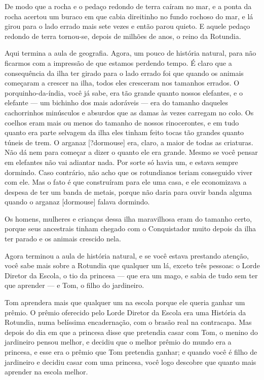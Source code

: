 De modo que a rocha e o pedaço redondo de terra caíram no mar, e a
ponta da rocha acertou um buraco em que cabia direitinho no fundo
rochoso do mar, e lá girou para o lado errado mais sete vezes e então
parou quieto. E aquele pedaço redondo de terra tornou-se, depois de
milhões de anos, o reino da Rotundia.

Aqui termina a aula de geografia. Agora, um pouco de história natural,
para não ficarmos com a impressão de que estamos perdendo tempo. É
claro que a consequência da ilha ter girado para o lado errado foi
que quando os animais começaram a crescer na ilha, todos eles
cresceram nos tamanhos errados. O porquinho-da-índia, você já sabe,
era tão grande quanto nossos elefantes, e o elefante — um bichinho
dos mais adoráveis — era do tamanho daqueles cachorrinhos minúsculos
e absurdos que as damas às vezes carregam no colo. Os coelhos eram
mais ou menos do tamanho de nossos rinocerontes, e em tudo quanto era
parte selvagem da ilha eles tinham feito tocas tão grandes quanto
túneis de trem. O arganaz [?dormouse] era, claro, a maior de todas as
criaturas. Não dá nem para começar a dizer o quanto ele era grande.
Mesmo se você pensar em elefantes não vai adiantar nada. Por sorte só
havia um, e estava sempre dormindo. Caso contrário, não acho que os
rotundianos teriam conseguido viver com ele. Mas o fato é que
construíram para ele uma casa, e ele economizava a despesa de ter um
banda de metais, porque não daria para ouvir banda alguma quando o
arganaz [dormouse] falava dormindo.

Os homens, mulheres e crianças dessa ilha maravilhosa eram do tamanho
certo, porque seus ancestrais tinham chegado com o Conquistador muito
depois da ilha ter parado e os animais crescido nela. 

Agora terminou a aula de história natural, e se você estava prestando
atenção, você sabe mais sobre a Rotundia que qualquer um lá, exceto
três pessoas: o Lorde Diretor da Escola, o tio da princesa — que era
um mago, e sabia de tudo sem ter que aprender — e Tom, o filho do
jardineiro.

Tom aprendera mais que qualquer um na escola porque ele queria ganhar
um prêmio. O prêmio oferecido pelo Lorde Diretor da Escola era uma
História da Rotundia, numa belíssima encadernação, com o brasão real
na contracapa. Mas depois do dia em que a princesa disse que
pretendia casar com Tom, o menino do jardineiro pensou melhor, e
decidiu que o melhor prêmio do mundo era a princesa, e esse era o
prêmio que Tom pretendia ganhar; e quando você é filho de jardineiro
e decidiu casar com uma princesa, você logo descobre que quanto mais
aprender na escola melhor. 

